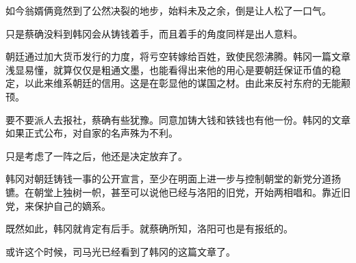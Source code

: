 如今翁婿俩竟然到了公然决裂的地步，始料未及之余，倒是让人松了一口气。

只是蔡确没料到韩冈会从铸钱着手，而且着手的角度同样是出人意料。

朝廷通过加大货币发行的力度，将亏空转嫁给百姓，致使民怨沸腾。韩冈一篇文章浅显易懂，就算仅仅是粗通文墨，也能看得出来他的用心是要朝廷保证币值的稳定，以此来维系朝廷的信用。这是在彰显他的谋国之材。由此来反衬东府的无能颟顸。

要不要派人去报社，蔡确有些犹豫。同意加铸大钱和铁钱也有他一份。韩冈的文章如果正式公布，对自家的名声殊为不利。

只是考虑了一阵之后，他还是决定放弃了。

韩冈对朝廷铸钱一事的公开宣言，至少在明面上进一步与控制朝堂的新党分道扬镳。在朝堂上独树一帜，甚至可以说他已经与洛阳的旧党，开始两相唱和。靠近旧党，来保护自己的嫡系。

既然如此，韩冈就肯定有后手。就蔡确所知，洛阳可也是有报纸的。

或许这个时候，司马光已经看到了韩冈的这篇文章了。

